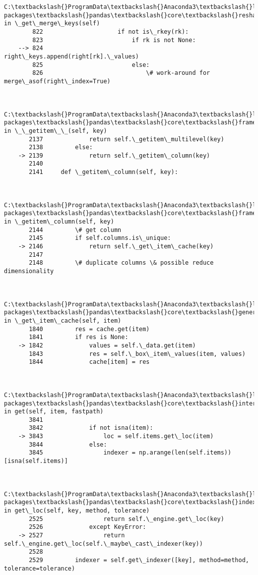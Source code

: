 \documentclass[11pt]{article}
\begin{document}
\begin{Verbatim}[commandchars=\\\{\}]
        C:\textbackslash{}ProgramData\textbackslash{}Anaconda3\textbackslash{}lib\textbackslash{}site-packages\textbackslash{}pandas\textbackslash{}core\textbackslash{}reshape\textbackslash{}merge.py in \_get\_merge\_keys(self)
        822                     if not is\_rkey(rk):
        823                         if rk is not None:
    --> 824                             right\_keys.append(right[rk].\_values)
        825                         else:
        826                             \# work-around for merge\_asof(right\_index=True)
    

        C:\textbackslash{}ProgramData\textbackslash{}Anaconda3\textbackslash{}lib\textbackslash{}site-packages\textbackslash{}pandas\textbackslash{}core\textbackslash{}frame.py in \_\_getitem\_\_(self, key)
       2137             return self.\_getitem\_multilevel(key)
       2138         else:
    -> 2139             return self.\_getitem\_column(key)
       2140 
       2141     def \_getitem\_column(self, key):
    

        C:\textbackslash{}ProgramData\textbackslash{}Anaconda3\textbackslash{}lib\textbackslash{}site-packages\textbackslash{}pandas\textbackslash{}core\textbackslash{}frame.py in \_getitem\_column(self, key)
       2144         \# get column
       2145         if self.columns.is\_unique:
    -> 2146             return self.\_get\_item\_cache(key)
       2147 
       2148         \# duplicate columns \& possible reduce dimensionality
    

        C:\textbackslash{}ProgramData\textbackslash{}Anaconda3\textbackslash{}lib\textbackslash{}site-packages\textbackslash{}pandas\textbackslash{}core\textbackslash{}generic.py in \_get\_item\_cache(self, item)
       1840         res = cache.get(item)
       1841         if res is None:
    -> 1842             values = self.\_data.get(item)
       1843             res = self.\_box\_item\_values(item, values)
       1844             cache[item] = res
    

        C:\textbackslash{}ProgramData\textbackslash{}Anaconda3\textbackslash{}lib\textbackslash{}site-packages\textbackslash{}pandas\textbackslash{}core\textbackslash{}internals.py in get(self, item, fastpath)
       3841 
       3842             if not isna(item):
    -> 3843                 loc = self.items.get\_loc(item)
       3844             else:
       3845                 indexer = np.arange(len(self.items))[isna(self.items)]
    

        C:\textbackslash{}ProgramData\textbackslash{}Anaconda3\textbackslash{}lib\textbackslash{}site-packages\textbackslash{}pandas\textbackslash{}core\textbackslash{}indexes\textbackslash{}base.py in get\_loc(self, key, method, tolerance)
       2525                 return self.\_engine.get\_loc(key)
       2526             except KeyError:
    -> 2527                 return self.\_engine.get\_loc(self.\_maybe\_cast\_indexer(key))
       2528 
       2529         indexer = self.get\_indexer([key], method=method, tolerance=tolerance)
    


\end{Verbatim}
\end{document}
